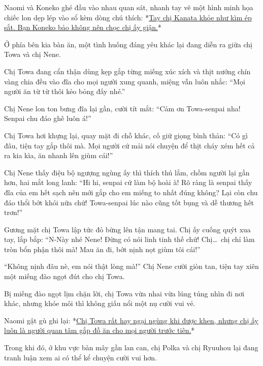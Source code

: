 \documentclass[../main.tex]{subfiles}
\begin{document}
Naomi và Koneko ghé đầu vào nhau quan sát, nhanh tay vẽ một hình minh họa chiếc lon dẹp lép vào sổ kèm dòng chú thích: *\uline{Tay chị Kanata khỏe như kìm ép sắt. Bạn Koneko bảo không nên chọc chị ấy giận.}*

\ct


Ở phía bên kia bàn ăn, một tình huống đáng yêu khác lại đang diễn ra giữa chị Towa và chị Nene.

Chị Towa đang cẩn thận dùng kẹp gắp từng miếng xúc xích và thịt nướng chín vàng chia đều vào đĩa cho mọi người xung quanh, miệng vẫn luôn nhắc: ``Mọi người ăn từ từ thôi kẻo bỏng đấy nhé.''

Chị Nene lon ton bưng đĩa lại gần, cười tít mắt: ``Cảm ơn Towa-senpai nha! Senpai chu đáo ghê luôn á!''

Chị Towa hơi khựng lại, quay mặt đi chỗ khác, cố giữ giọng bình thản: ``Có gì đâu, tiện tay gắp thôi mà. Mọi người cứ mải nói chuyện để thịt cháy xém hết cả ra kia kìa, ăn nhanh lên giùm cái!''

Chị Nene thấy điệu bộ ngượng ngùng ấy thì thích thú lắm, chồm người lại gần hơn, hai mắt long lanh: ``Hi hi, senpai cứ làm bộ hoài à! Rõ ràng là senpai thấy đĩa của em hết sạch nên mới gắp cho em miếng to nhất đúng không? Lại còn chu đáo thổi bớt khói nữa chứ! Towa-senpai lúc nào cũng tốt bụng và dễ thương hết trơn!''

Gương mặt chị Towa lập tức đỏ bừng lên tận mang tai. Chị ấy cuống quýt xua tay, lắp bắp: ``N-Này nhé Nene! Đừng có nói linh tinh thế chứ! Chị\dots\ chị chỉ làm tròn bổn phận thôi mà! Mau ăn đi, bớt nịnh nọt giùm tôi cái!''

``Không nịnh đâu nè, em nói thật lòng mà!'' Chị Nene cười giòn tan, tiện tay xiên một miếng đào ngọt đút cho chị Towa.

Bị miếng đào ngọt lịm chặn lời, chị Towa vừa nhai vừa lúng túng nhìn đi nơi khác, nhưng khóe môi thì không giấu nổi một nụ cười vui vẻ.

Naomi gật gù ghi lại: *\uline{Chị Towa rất hay ngại ngùng khi được khen, nhưng chị ấy luôn là người quan tâm gắp đồ ăn cho mọi người trước tiên.}*

\ct


Trong khi đó, ở khu vực bàn mây gần lan can, chị Polka và chị Ryuuhou lại đang tranh luận xem ai có thể kể chuyện cười vui hơn.
\end{document}
